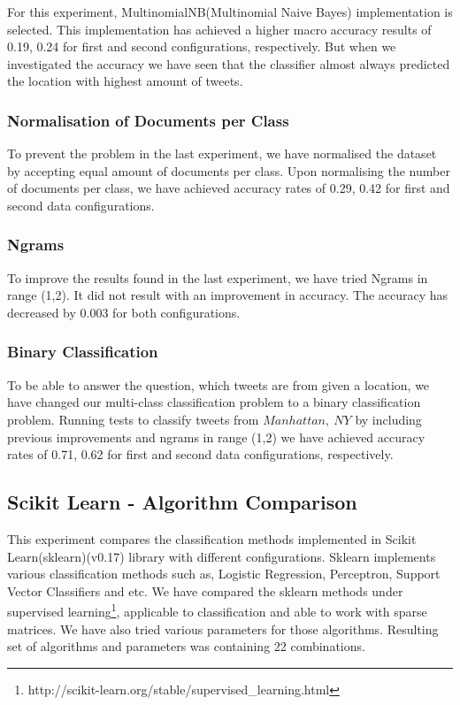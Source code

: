 \documentclass[twoside,11pt]{article}
\begin{document}
For this experiment, MultinomialNB(Multinomial Naive Bayes) implementation is selected. This implementation has achieved a higher macro accuracy results of 0.19, 0.24 for first and second configurations, respectively. But when we investigated the accuracy we have seen that the classifier almost always predicted the location with highest amount of tweets.

\subsubsection{Normalisation of Documents per Class}
To prevent the problem in the last experiment, we have normalised the dataset by accepting equal amount of documents per class. Upon normalising the number of documents per class, we have achieved accuracy rates of 0.29, 0.42 for first and second data configurations.

\subsubsection{Ngrams}
To improve the results found in the last experiment, we have tried Ngrams in range (1,2). It did not result with an improvement in accuracy. The accuracy has decreased by 0.003 for both configurations.

\subsubsection{Binary Classification}
To be able to answer the question, which tweets are from given a location, we have changed our multi-class classification problem to a binary classification problem. Running tests to classify tweets from $Manhattan,\ NY$ by including previous improvements and ngrams in range (1,2) we have achieved accuracy rates of 0.71, 0.62 for first and second data configurations, respectively. 

\subsection{Scikit Learn - Algorithm Comparison}
This experiment compares the classification methods implemented in Scikit Learn(sklearn)(v0.17) library with different configurations. Sklearn implements various classification methods such as, Logistic Regression, Perceptron, Support Vector Classifiers and etc. We have compared the sklearn methods under supervised learning\footnote{http://scikit-learn.org/stable/supervised\_learning.html}, applicable to classification and able to work with sparse matrices. We have also tried various parameters for those algorithms. Resulting set of algorithms and parameters was containing 22 combinations.
\end{document}
